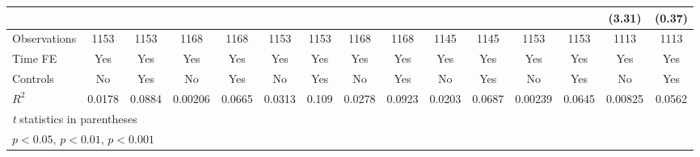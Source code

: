 {\begin{tabular}{l*{14}{c}}
                &                  &                  &                  &                  &                  &                  &                  &                  &                  &                  &                  &                  &   (3.31)         &   (0.37)         \\
\hline
Observations    &     1153         &     1153         &     1168         &     1168         &     1153         &     1153         &     1168         &     1168         &     1145         &     1145         &     1153         &     1153         &     1113         &     1113         \\
Time FE         &      Yes         &      Yes         &      Yes         &      Yes         &      Yes         &      Yes         &      Yes         &      Yes         &      Yes         &      Yes         &      Yes         &      Yes         &      Yes         &      Yes         \\
Controls        &       No         &      Yes         &       No         &      Yes         &       No         &      Yes         &       No         &      Yes         &       No         &      Yes         &       No         &      Yes         &       No         &      Yes         \\
$ R^2 $         &   0.0178         &   0.0884         &  0.00206         &   0.0665         &   0.0313         &    0.109         &   0.0278         &   0.0923         &   0.0203         &   0.0687         &  0.00239         &   0.0645         &  0.00825         &   0.0562         \\
\hline\hline
\multicolumn{15}{l}{\footnotesize \textit{t} statistics in parentheses}\\
\multicolumn{15}{l}{\footnotesize \sym{*} \(p<0.05\), \sym{**} \(p<0.01\), \sym{***} \(p<0.001\)}\\
\end{tabular}
}
